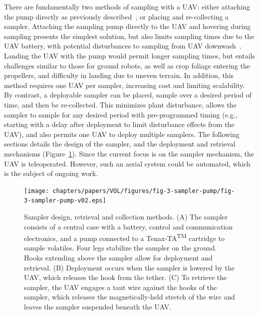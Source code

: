 There are fundamentally two methods of sampling with a UAV: either attaching the pump directly as previously described~\cite{mckinney_sampler_2019}, or placing and re-collecting a sampler. Attaching the sampling pump directly to the UAV and hovering during sampling presents the simplest solution, but also limits sampling times due to the UAV battery, with potential disturbances to sampling from UAV downwash~\cite{mckinney_sampler_2019}. Landing the UAV with the pump would permit longer sampling times, but entails challenges similar to those for ground robots, as well as crop foliage entering the propellers, and difficulty in landing due to uneven terrain. In addition, this method requires one UAV per sampler, increasing cost and limiting scalability.
By contrast, a deployable sampler can be placed, sample over a desired period of time, and then be re-collected. This minimizes plant disturbance, allows the sampler to sample for any desired period with pre-programmed timing (e.g., starting with a delay after deployment to limit disturbance effects from the UAV), and also permits one UAV to deploy multiple samplers. The following sections details the design of the sampler, and the deployment and retrieval mechanisms (Figure~\ref{fig-3-pump-collection}). Since the current focus is on the sampler mechanism, the UAV is teleoperated. However, such an aerial system could be automated, which is the subject of ongoing work.

\begin{figure}[!t]
\centering
\texttt{[image: chapters/papers/VOL/figures/fig-3-sampler-pump/fig-3-sampler-pump-v02.eps]}
\caption{Sampler design, retrieval and collection methods. (A) The sampler consists of a central case with a battery, control and communication electronics, and a pump connected to a Tenax-TA\textsuperscript{TM} cartridge to sample volatiles. Four legs stabilize the sampler on the ground. Hooks extending above the sampler allow for deployment and retrieval. (B) Deployment occurs when the sampler is lowered by the UAV, which releases the hook from the tether. (C) To retrieve the sampler, the UAV engages a taut wire against the hooks of the sampler, which releases the magnetically-held stretch of the wire and leaves the sampler suspended beneath the UAV. }
\label{fig-3-pump-collection}
\end{figure}

